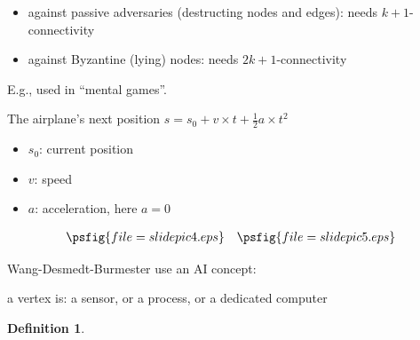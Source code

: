 \documentclass[portrait]{seminar}
\newtheorem{defn}[thm]{Definition}
\begin{document}

\begin{itemize}
\vskip -10pt
\item against passive adversaries (destructing nodes and edges): 
needs $k+1$-connectivity


\vskip -10pt
\item against Byzantine (lying) nodes: needs $2k+1$-connectivity

\end{itemize}

\nopagebreak
E.g., used in ``mental games''.

\newpage
{}

The airplane's next position 
$s=s_0+v\times t+\frac{1}{2}a\times t^2$
\begin{itemize}
\vskip 3pt
\item $s_0$: current position
\vskip 3pt
\item $v$: speed
\vskip 3pt
\item $a$: acceleration, here $a=0$
\end{itemize}

\vskip 0pt
$$\begin{array}{ll}
\psfig{file=slidepic4.eps} &
\psfig{file=slidepic5.eps}
\end{array}$$


\newpage
Wang-Desmedt-Burmester use an AI concept:

\vskip 5pt
\begin{center}
\end{center}

\vskip -20pt
\noindent
a vertex is: a sensor, or a process, or a dedicated computer


\begin{defn}
\end{defn}
\end{document}
